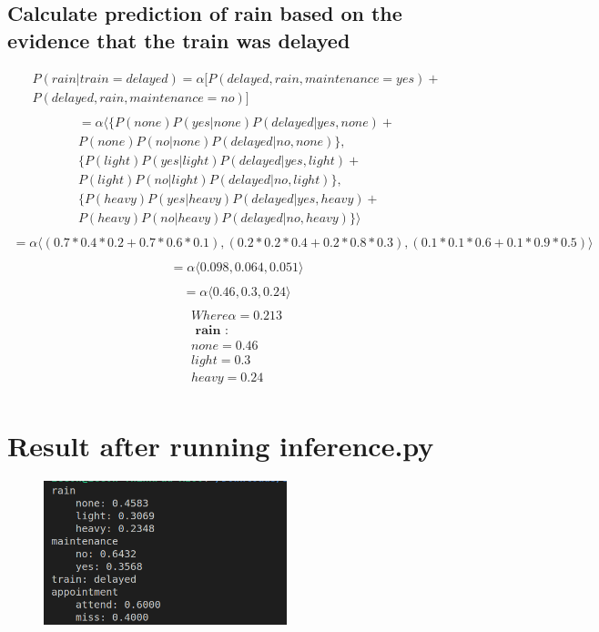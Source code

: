 \documentclass[16pt, A4Paper]{article}
\begin{document}
\subsection*{Calculate prediction of rain based on the evidence that the train was delayed}
\begin{multline*}
P(rain | train=delayed) = \alpha [ P(delayed , rain , maintenance = yes ) +\\ P(delayed , rain , maintenance = no ) ] \\
\end{multline*}
\begin{multline*}
 = \alpha \langle \{ P (none) P(yes | none) P(delayed | yes , none) +\\ P(none) P(no | none) P(delayed | no , none) \},\\ \{ P(light) P(yes | light) P(delayed | yes , light) +\\ P(light) P(no | light) P(delayed | no , light) \} ,\\ \{ P(heavy) P(yes | heavy) P(delayed | yes , heavy) +\\ P(heavy) P(no | heavy) P(delayed | no , heavy) \}  \rangle \\
 \end{multline*}
\begin{multline*}
 = \alpha \langle  (0.7 * 0.4 * 0.2 + 0.7 * 0.6 * 0.1) , ( 0.2 * 0.2 * 0.4 + 0.2 * 0.8 * 0.3 ) , ( 0.1 * 0.1 * 0.6 + 0.1 * 0.9 * 0.5 )  \rangle \\
 \end{multline*}
\begin{multline*}
  = \alpha \langle  0.098 , 0.064 , 0.051  \rangle \\
  \end{multline*}
\begin{multline*}
  = \alpha \langle  0.46 , 0.3 , 0.24  \rangle \\
  \end{multline*}
\begin{multline*}
  Where \alpha = 0.213 \\
  \textbf{ rain : }\\
  none = 0.46 \\
  light = 0.3 \\
  heavy = 0.24 \\
\end{multline*}

\section*{Result after running inference.py}
\begin{figure}[htpb]
\centering
\includegraphics[width=200pt]{image.png}
\end{figure}
\end{document}

